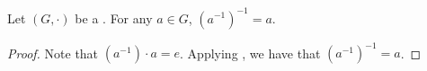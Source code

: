 \begin{corollary} \label{corollary:inverse_of_inverse_in_group_is_element}
    Let $(G,\cdot)$ be a . For any $a \in G$, $\left( a^{-1} \right)^{-1} = a$.
\end{corollary}
\begin{proof}
    Note that $\left( a^{-1} \right) \cdot a = e$. Applying , we have that $\left( a^{-1} \right)^{-1} = a$.
\end{proof}
